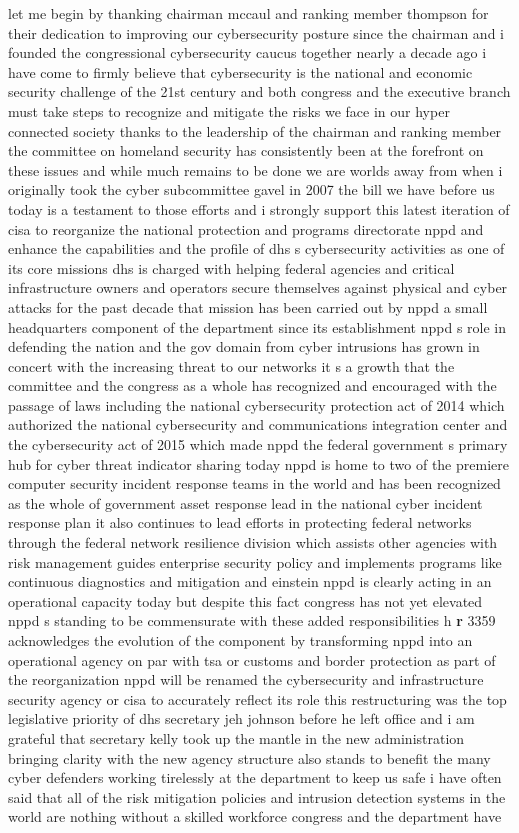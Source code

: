 \documentclass{article}
\begin{document}
let me begin by thanking chairman mccaul and ranking member thompson for their dedication to improving our cybersecurity posture since the chairman and i founded the congressional cybersecurity caucus together nearly a decade ago i have come to firmly believe that cybersecurity is the national and economic security challenge of the 21st century and both congress and the executive branch must take steps to recognize and mitigate the risks we face in our hyper connected society thanks to the leadership of the chairman and ranking member the committee on homeland security has consistently been at the forefront on these issues and while much remains to be done we are worlds away from when i originally took the cyber subcommittee gavel in 2007 the bill we have before us today is a testament to those efforts and i strongly support this latest iteration of cisa to reorganize the national protection and programs directorate nppd and enhance the capabilities and the profile of dhs s cybersecurity activities as one of its core missions dhs is charged with helping federal agencies and critical infrastructure owners and operators secure themselves against physical and cyber attacks for the past decade that mission has been carried out by nppd a small headquarters component of the department since its establishment nppd s role in defending the nation and the gov domain from cyber intrusions has grown in concert with the increasing threat to our networks it s a growth that the committee and the congress as a whole has recognized and encouraged with the passage of laws including the national cybersecurity protection act of 2014 which authorized the national cybersecurity and communications integration center and the cybersecurity act of 2015 which made nppd the federal government s primary hub for cyber threat indicator sharing today nppd is home to two of the premiere computer security incident response teams in the world and has been recognized as the whole of government asset response lead in the national cyber incident response plan it also continues to lead efforts in protecting federal networks through the federal network resilience division which assists other agencies with risk management guides enterprise security policy and implements programs like continuous diagnostics and mitigation and einstein nppd is clearly acting in an operational capacity today but despite this fact congress has not yet elevated nppd s standing to be commensurate with these added responsibilities h {\bf \color{red} r} 3359 acknowledges the evolution of the component by transforming nppd into an operational agency on par with tsa or customs and border protection as part of the reorganization nppd will be renamed the cybersecurity and infrastructure security agency or cisa to accurately reflect its role this restructuring was the top legislative priority of dhs secretary jeh johnson before he left office and i am grateful that secretary kelly took up the mantle in the new administration bringing clarity with the new agency structure also stands to benefit the many cyber defenders working tirelessly at the department to keep us safe i have often said that all of the risk mitigation policies and intrusion detection systems in the world are nothing without a skilled workforce congress and the department have 
\end{document}
